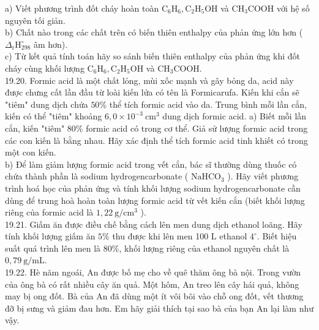 \documentclass[10pt]{article}
\begin{document}
a) Viết phương trình đốt cháy hoàn toàn $\mathrm{C}_{6} \mathrm{H}_{6}, \mathrm{C}_{2} \mathrm{H}_{5} \mathrm{OH}$ và $\mathrm{CH}_{3} \mathrm{COOH}$ với hệ số nguyên tối giản.\\
b) Chất nào trong các chất trên có biến thiên enthalpy của phản ứng lớn hơn ( $\Delta_{\mathrm{r}} \mathrm{H}_{298}^{\circ}$ âm hơn).\\
c) Từ kết quả tính toán hãy so sánh biến thiên enthalpy của phản ứng khi đốt cháy cùng khối lượng $\mathrm{C}_{6} \mathrm{H}_{6}, \mathrm{C}_{2} \mathrm{H}_{5} \mathrm{OH}$ và $\mathrm{CH}_{3} \mathrm{COOH}$.\\
19.20. Formic acid là một chất lỏng, mùi xốc mạnh và gây bỏng da, acid này được chưng cất lần đầu từ loài kiến lửa có tên là Formicarufa. Kiến khi cắn sẽ "tiêm" dung dịch chứa $50 \%$ thể tích formic acid vào da. Trung bình mỗi lần cắn, kiến có thể "tiêm" khoảng $6,0 \times 10^{-3} \mathrm{~cm}^{3}$ dung dịch formic acid. a) Biết mỗi lần cắn, kiến "tiêm" $80 \%$ formic acid có trong cơ thể. Giả sử lượng formic acid trong các con kiến là bằng nhau. Hãy xác định thể tích formic acid tinh khiết có trong một con kiến.\\
b) Để làm giảm lượng formic acid trong vết cắn, bác sĩ thường dùng thuốc có chứa thành phần là sodium hydrogencarbonate ( $\mathrm{NaHCO}_{3}$ ). Hãy viết phương trình hoá học của phản ứng và tính khối lượng sodium hydrogencarbonate cần dùng để trung hoà hoàn toàn lượng formic acid từ vết kiến cắn (biết khối lượng riêng của formic acid là $1,22 \mathrm{~g} / \mathrm{cm}^{3}$ ).\\
19.21. Giấm ăn được điều chế bằng cách lên men dung dịch ethanol loãng. Hãy tính khối lượng giấm ăn $5 \%$ thu được khi lên men 100 L ethanol $4^{\circ}$. Biết hiệu suất quá trình lên men là $80 \%$, khối lượng riêng của ethanol nguyên chất là $0,79 \mathrm{~g} / \mathrm{mL}$.\\
19.22. Hè năm ngoái, An được bố mẹ cho về quê thăm ông bà nội. Trong vườn của ông bà có rất nhiều cây ăn quả. Một hôm, An treo lên cây hái quả, không may bị ong đốt. Bà của An đã dùng một ít vôi bôi vào chỗ ong đốt, vết thương đỡ bị sưng và giảm đau hơn. Em hãy giải thích tại sao bà của bạn An lại làm như vậy.
\end{document}

